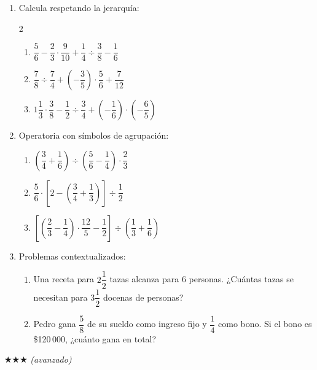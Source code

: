 \documentclass[11pt, letterpaper]{article}
\begin{document}
\begin{enumerate}[label=\textbf{\arabic*.}, leftmargin=*]

\item Calcula respetando la jerarqu\'ia:
\begin{multicols}{2}
\begin{enumerate}[label=\alph*)]
  \item $\dfrac{5}{6}-\dfrac{2}{3}\cdot\dfrac{9}{10}+\dfrac{1}{4}\div\dfrac{3}{8}-\dfrac{1}{6}$
  \item $\dfrac{7}{8}\div\dfrac{7}{4}+\left(-\dfrac{3}{5}\right)\cdot\dfrac{5}{6}+\dfrac{7}{12}$
  \item $1\dfrac{1}{3}\cdot\dfrac{3}{8}-\dfrac{1}{2}\div\dfrac{3}{4}+\left(-\dfrac{1}{6}\right)\cdot\left(-\dfrac{6}{5}\right)$
\end{enumerate}
\end{multicols}

\item Operatoria con s\'imbolos de agrupaci\'on:
\begin{enumerate}[label=\alph*)]
  \item $\left(\dfrac{3}{4}+\dfrac{1}{6}\right)\div\left(\dfrac{5}{6}-\dfrac{1}{4}\right)\cdot\dfrac{2}{3}$
  \item $\dfrac{5}{6}\cdot\left[2-\left(\dfrac{3}{4}+\dfrac{1}{3}\right)\right]\div\dfrac{1}{2}$
  \item $\left[\left(\dfrac{2}{3}-\dfrac{1}{4}\right)\cdot\dfrac{12}{5}-\dfrac{1}{2}\right]\div\left(\dfrac{1}{3}+\dfrac{1}{6}\right)$
\end{enumerate}

\item Problemas contextualizados:
\begin{enumerate}[label=\alph*)]
  \item Una receta para $2\dfrac{1}{2}$ tazas alcanza para 6 personas. ¿Cu\'antas tazas se necesitan para $3\dfrac{1}{2}$ docenas de personas?
  \item Pedro gana $\dfrac{5}{8}$ de su sueldo como ingreso fijo y $\dfrac{1}{4}$ como bono. Si el bono es \$120\,000, ¿cu\'anto gana en total?
\end{enumerate}

\end{enumerate}

$\bigstar\bigstar\bigstar$ \textit{(avanzado)}
\end{document}
